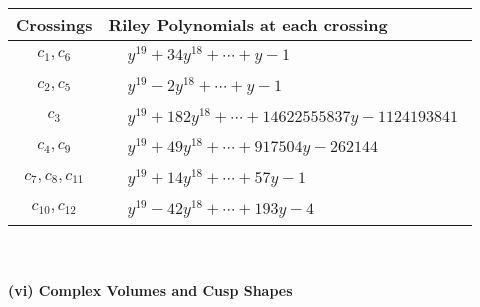 \documentclass[1p]{elsarticle_modified}
\theoremstyle{definition}
\begin{document}
\begin{tabular}{m{50pt}|m{274pt}}
Crossings & \hspace{64pt}Riley Polynomials at each crossing \\
\hline $$\begin{aligned}c_{1},c_{6}\end{aligned}$$&$\begin{aligned}
&y^{19}+34 y^{18}+\cdots+y-1
\end{aligned}$\\
\hline $$\begin{aligned}c_{2},c_{5}\end{aligned}$$&$\begin{aligned}
&y^{19}-2 y^{18}+\cdots+y-1
\end{aligned}$\\
\hline $$\begin{aligned}c_{3}\end{aligned}$$&$\begin{aligned}
&y^{19}+182 y^{18}+\cdots+14622555837 y-1124193841
\end{aligned}$\\
\hline $$\begin{aligned}c_{4},c_{9}\end{aligned}$$&$\begin{aligned}
&y^{19}+49 y^{18}+\cdots+917504 y-262144
\end{aligned}$\\
\hline $$\begin{aligned}c_{7},c_{8},c_{11}\end{aligned}$$&$\begin{aligned}
&y^{19}+14 y^{18}+\cdots+57 y-1
\end{aligned}$\\
\hline $$\begin{aligned}c_{10},c_{12}\end{aligned}$$&$\begin{aligned}
&y^{19}-42 y^{18}+\cdots+193 y-4
\end{aligned}$\\
\hline
\end{tabular}\\~\\
\newpage\flushleft \textbf{(vi) Complex Volumes and Cusp Shapes}
\end{document}
